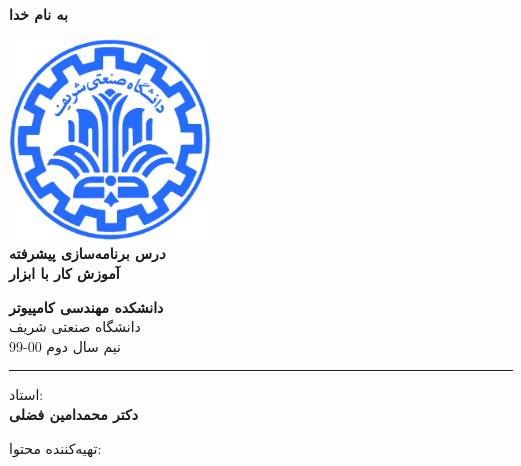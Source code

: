 \documentclass[]{article}
\begin{document}
\begin{titlepage}
\begin{center}

\textbf{ \Huge{به نام خدا} }
        
\vspace{0.2cm}

\includegraphics[width=0.4\textwidth]{sharif1.png}\\
\vspace{0.2cm}
\textbf{ \Huge{\emph درس برنامه‌سازی پیشرفته} }\\
\vspace{0.25cm}
\textbf{ \Large{ آموزش کار با ابزار } }
\vspace{0.2cm}
       
 
      \large \textbf{دانشکده مهندسی کامپیوتر}\\\vspace{0.1cm}
    \large   دانشگاه صنعتی شریف\\\vspace{0.2cm}
       \large   ﻧﯿﻢ سال دوم 00-99 \\\vspace{0.10cm}
      \noindent\rule[1ex]{\linewidth}{1pt}
استاد:\\
    \textbf{{دکتر محمدامین فضلی}}



    \vspace{0.10cm}
تهیه‌کننده محتوا:\\
    \textbf{}
    
\end{center}
\end{titlepage}


\newpage
\pagestyle{fancy}
\fancyhf{}
\fancyfoot{}
\cfoot{\thepage}
\renewcommand{\headrulewidth}{2pt}
\end{document}
